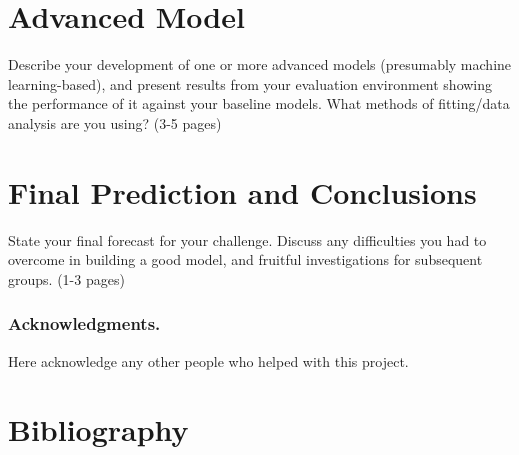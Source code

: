 \documentclass[runningheads]{llncs}
\begin{document}
\section{Advanced Model}
Describe your development of one or more advanced models (presumably machine learning-based), and present results from your evaluation environment showing the performance of it against your baseline models. What methods of fitting/data analysis are you using? (3-5 pages)

\section{Final Prediction and Conclusions}

State your final forecast for your challenge.  Discuss any difficulties you had to overcome in building a good model, and fruitful investigations for subsequent groups.   (1-3 pages)




\subsubsection*{Acknowledgments.} Here acknowledge any other people who helped with this project.

\section{Bibliography}\label{references}
\end{document}
